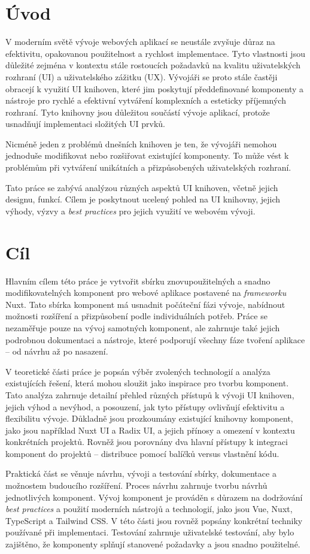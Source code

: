 
\chapter{Úvod}
V moderním světě vývoje webových aplikací se neustále zvyšuje důraz na efektivitu, opakovanou použitelnost a rychlost implementace. Tyto vlastnosti jsou důležité zejména v kontextu stále rostoucích požadavků na kvalitu uživatelských rozhraní (UI) a uživatelského zážitku (UX). Vývojáři se proto stále častěji obracejí k využití UI knihoven, které jim poskytují předdefinované komponenty a nástroje pro rychlé a efektivní vytváření komplexních a esteticky příjemných rozhraní. Tyto knihovny jsou důležitou součástí vývoje aplikací, protože usnadňují implementaci složitých UI prvků.

Nicméně jeden z problémů dnešních knihoven je ten, že vývojáři nemohou jednoduše modifikovat nebo rozšiřovat existující komponenty. To může vést k problémům při vytváření unikátních a přizpůsobených uživatelských rozhraní.

Tato práce se zabývá analýzou různých aspektů UI knihoven, včetně jejich designu, funkcí. Cílem je poskytnout ucelený pohled na UI knihovny, jejich výhody, výzvy a \emph{best practices} pro jejich využití ve webovém vývoji.


\chapter{Cíl}
Hlavním cílem této práce je vytvořit sbírku znovupoužitelných a snadno modifikovatelných komponent pro webové aplikace postavené na \emph{frameworku} Nuxt. Tato sbírka komponent má usnadnit počáteční fázi vývoje, nabídnout možnosti rozšíření a přizpůsobení podle individuálních potřeb. Práce se nezaměřuje pouze na vývoj samotných komponent, ale zahrnuje také jejich podrobnou dokumentaci a nástroje, které podporují všechny fáze tvoření aplikace – od návrhu až po nasazení.

V teoretické části práce je popsán výběr zvolených technologií a analýza existujících řešení, která mohou sloužit jako inspirace pro tvorbu komponent. Tato analýza zahrnuje detailní přehled různých přístupů k vývoji UI knihoven, jejich výhod a nevýhod, a posouzení, jak tyto přístupy ovlivňují efektivitu a flexibilitu vývoje. Důkladně jsou prozkoumány existující knihovny komponent, jako jsou například Nuxt UI a Radix UI, a jejich přínosy a omezení v kontextu konkrétních projektů. Rovněž jsou porovnány dva hlavní přístupy k integraci komponent do projektů – distribuce pomocí balíčků versus vlastnění kódu.

Praktická část se věnuje návrhu, vývoji a testování sbírky, dokumentace a možnostem budoucího rozšíření. Proces návrhu zahrnuje tvorbu návrhů jednotlivých komponent. Vývoj komponent je prováděn s důrazem na dodržování \emph{best practices} a použití moderních nástrojů a technologií, jako jsou Vue, Nuxt, TypeScript a Tailwind CSS. V této části jsou rovněž popsány konkrétní techniky používané při implementaci. Testování zahrnuje uživatelské testování, aby bylo zajištěno, že komponenty splňují stanovené požadavky a jsou snadno použitelné.
